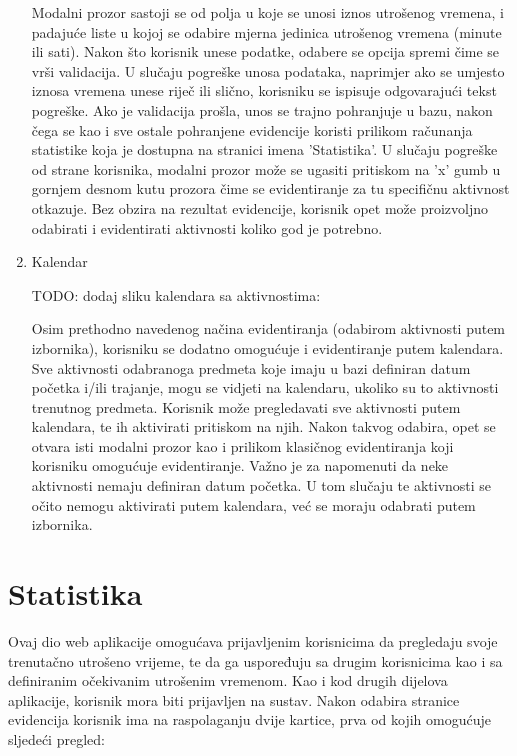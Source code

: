 \documentclass[times, utf8, zavrsni]{fer}
\begin{document}
\begin{enumerate}
Modalni prozor sastoji se od polja u koje se unosi iznos utrošenog vremena, i padajuće liste u kojoj se odabire mjerna jedinica utrošenog vremena (minute ili sati). Nakon što korisnik unese podatke, odabere se opcija spremi čime se vrši validacija. U slučaju pogreške unosa podataka, naprimjer ako se umjesto iznosa vremena unese riječ ili slično, korisniku se ispisuje odgovarajući tekst pogreške. Ako je validacija prošla, unos se trajno pohranjuje u bazu, nakon čega se kao i sve ostale pohranjene evidencije koristi prilikom računanja statistike koja je dostupna na stranici imena 'Statistika'. U slučaju pogreške od strane korisnika, modalni prozor može se ugasiti pritiskom na 'x' gumb u gornjem desnom kutu prozora čime se evidentiranje za tu specifičnu aktivnost otkazuje. Bez obzira na rezultat evidencije, korisnik opet može proizvoljno odabirati i evidentirati aktivnosti koliko god je potrebno.\\

\item Kalendar

TODO: dodaj sliku kalendara sa aktivnostima:

Osim prethodno navedenog načina evidentiranja (odabirom aktivnosti putem izbornika), korisniku se dodatno omogućuje i evidentiranje putem kalendara. Sve aktivnosti odabranoga predmeta koje imaju u bazi definiran datum početka i/ili trajanje, mogu se vidjeti na kalendaru, ukoliko su to aktivnosti trenutnog predmeta. Korisnik može pregledavati sve aktivnosti putem kalendara, te ih aktivirati pritiskom na njih. Nakon takvog odabira, opet se otvara isti modalni prozor kao i prilikom klasičnog evidentiranja koji korisniku omogućuje evidentiranje. Važno je za napomenuti da neke aktivnosti nemaju definiran datum početka. U tom slučaju te aktivnosti se očito nemogu aktivirati putem kalendara, već se moraju odabrati putem izbornika.\\

\end{enumerate}

\section{Statistika}
Ovaj dio web aplikacije omogućava prijavljenim korisnicima da pregledaju svoje trenutačno utrošeno vrijeme, te da ga uspoređuju sa drugim korisnicima kao i sa definiranim očekivanim utrošenim vremenom. Kao i kod drugih dijelova aplikacije, korisnik mora biti prijavljen na sustav. Nakon odabira stranice evidencija korisnik ima na raspolaganju dvije kartice, prva od kojih omogućuje sljedeći pregled:
\end{document}
